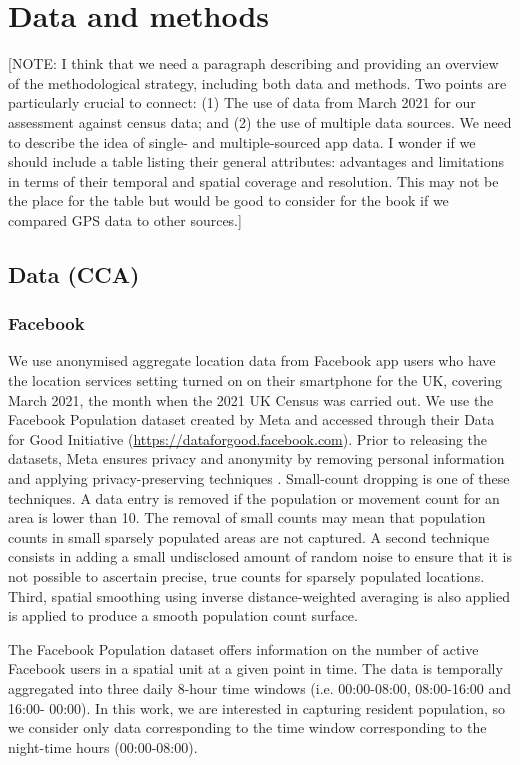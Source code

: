\documentclass[]{rsos}%
\begin{document}
\section{Data and methods}\label{data-and-methods}

{[}NOTE: I think that we need a paragraph describing and providing an overview of the methodological strategy, including both data and methods. Two points are particularly crucial to connect: (1) The use of data from March 2021 for our assessment against census data; and (2) the use of multiple data sources. We need to describe the idea of single- and multiple-sourced app data. I wonder if we should include a table listing their general attributes: advantages and limitations in terms of their temporal and spatial coverage and resolution. This may not be the place for the table but would be good to consider for the book if we compared GPS data to other sources.{]}

\subsection{Data (CCA)}\label{data-cca}

\subsubsection{Facebook}\label{facebook}

We use anonymised aggregate location data from Facebook app users who
have the location services setting turned on on their smartphone for the
UK, covering March 2021, the month when the 2021 UK Census was carried
out. We use the Facebook Population dataset created by Meta and accessed
through their Data for Good Initiative
(\url{https://dataforgood.facebook.com}). Prior to releasing the datasets,
Meta ensures privacy and anonymity by removing personal information and
applying privacy-preserving techniques \citep{maas2019} . Small-count
dropping is one of these techniques. A data entry is removed if the
population or movement count for an area is lower than 10. The removal
of small counts may mean that population counts in small sparsely
populated areas are not captured. A second technique consists in adding
a small undisclosed amount of random noise to ensure that it is not
possible to ascertain precise, true counts for sparsely populated
locations. Third, spatial smoothing using inverse distance-weighted
averaging is also applied is applied to produce a smooth population
count surface.

The Facebook Population dataset offers information on the number of
active Facebook users in a spatial unit at a given point in time. The
data is temporally aggregated into three daily 8-hour time windows (i.e.
00:00-08:00, 08:00-16:00 and 16:00- 00:00). In this work, we are
interested in capturing resident population, so we consider only data
corresponding to the time window corresponding to the night-time hours
(00:00-08:00).
\end{document}
